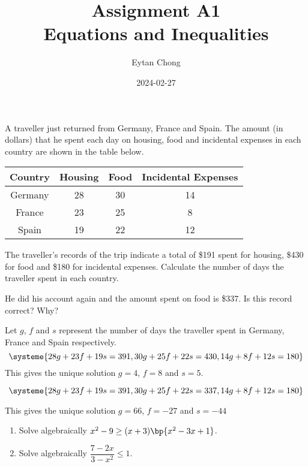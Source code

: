 \documentclass{echw}
\title{Assignment A1\\Equations and Inequalities}
\author{Eytan Chong}
\date{2024-02-27}
\begin{document}
    \problem{}
        A traveller just returned from Germany, France and Spain. The amount (in dollars) that he spent each day on housing, food and incidental expenses in each country are shown in the table below.

        \begin{table}[h]
            \centering
            \begin{tabular}{|c|c|c|c|}
            \hline
            \textbf{Country} & \textbf{Housing} & \textbf{Food} & \textbf{Incidental Expenses}  \\\hline
            Germany & 28      & 30   & 14                   \\\hline
            France  & 23      & 25   & 8                    \\\hline
            Spain   & 19      & 22   & 12 \\\hline                  
            \end{tabular}
        \end{table}

        The traveller's records of the trip indicate a total of \$191 spent for housing, \$430 for food and \$180 for incidental expenses. Calculate the number of days the traveller spent in each country.

        He did his account again and the amount spent on food is \$337. Is this record correct? Why?

    \solution
        Let $g$, $f$ and $s$ represent the number of days the traveller spent in Germany, France and Spain respectively.
        \[
            \systeme{
                28g + 23f + 19s = 391,
                30g + 25f + 22s = 430,
                14g + 8f + 12s = 180
            }
        \]
        This gives the unique solution $g=4$, $f=8$ and $s=5$.


        \[
            \systeme{
                28g + 23f + 19s = 391,
                30g + 25f + 22s = 337,
                14g + 8f + 12s = 180
            }
        \]

        This gives the unique solution $g=66$, $f=-27$ and $s=-44$


    \problem{}
        \begin{enumerate}
            \item Solve algebraically $x^2 - 9 \geq (x+3)\bp{x^2 - 3x + 1}$.
            \item Solve algebraically $\dfrac{7-2x}{3-x^2} \leq 1$.
        \end{enumerate}
\end{document}
